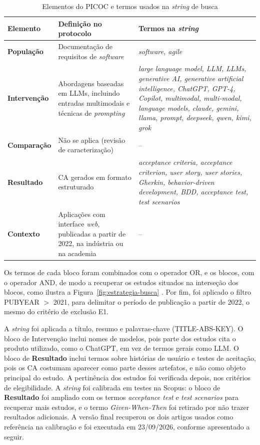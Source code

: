 \begin{table}[H]
  \centering
  \caption{Elementos do PICOC e termos usados na \textit{string} de busca}
  \label{tab:picoc}
  \small
  \begin{tabular}{|p{}|p{}|p{}|}
    \hline
    \textbf{Elemento} & \textbf{Definição no protocolo} & \textbf{Termos na \textit{string}} \\ \hline
    \textbf{População} & Documentação de requisitos de \textit{software} & \textit{software, agile} \\ \hline
    \textbf{Intervenção} & Abordagens baseadas em LLMs, incluindo entradas multimodais e técnicas de \textit{prompting} & \textit{large language model, LLM, LLMs, generative AI, generative artificial intelligence, ChatGPT, GPT-4, Copilot, multimodal, multi-modal, language models, claude, gemini, llama, prompt, deepseek, qwen, kimi, grok} \\ \hline
    \textbf{Comparação} & Não se aplica (revisão de caracterização) & -- \\ \hline
    \textbf{Resultado} & CA gerados em formato estruturado & \textit{acceptance criteria, acceptance criterion, user story, user stories, Gherkin, behavior-driven development, BDD, acceptance test, test scenarios} \\ \hline
    \textbf{Contexto} & Aplicações com interface \textit{web}, publicadas a partir de 2022, na indústria ou na academia & -- \\ \hline
  \end{tabular}
\end{table}

Os termos de cada bloco foram combinados com o operador OR, e os blocos, com o operador AND, de modo a recuperar os estudos situados na interseção dos blocos, como ilustra a Figura~\ref{fig:estrategia-busca} \cite{pai2004}. Por fim, foi aplicado o filtro PUBYEAR $>$ 2021, para delimitar o período de publicação a partir de 2022, o mesmo do critério de exclusão E1.

A \textit{string} foi aplicada a título, resumo e palavras-chave (TITLE-ABS-KEY). O bloco de Intervenção inclui nomes de modelos, pois parte dos estudos cita o produto utilizado, como o ChatGPT, em vez de termos gerais como LLM. O bloco de \textbf{Resultado} inclui termos sobre histórias de usuário e testes de aceitação, pois os CA costumam aparecer como parte desses artefatos, e não como objeto principal do estudo. A pertinência dos estudos foi verificada depois, nos critérios de elegibilidade. A \textit{string} foi calibrada em testes na Scopus: o bloco de \textbf{Resultado} foi ampliado com os termos \textit{acceptance test} e \textit{test scenarios} para recuperar mais estudos, e o termo \textit{Given-When-Then} foi retirado por não trazer resultados adicionais. A versão final recuperou os dois artigos usados como referência na calibração \cite{ferreira2025,wang2025} e foi executada em 23/09/2026, conforme apresentado a seguir.

